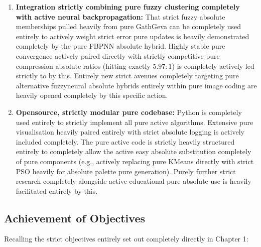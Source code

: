 \begin{enumerate}
    \item \textbf{Integration strictly combining pure fuzzy clustering completely with active neural backpropagation:} That strict fuzzy absolute memberships pulled heavily from pure GathGeva can be completely used entirely to actively weight strict error pure updates is heavily demonstrated completely by the pure FBPNN absolute hybrid. Highly stable pure convergence actively paired directly with strictly competitive pure compression absolute ratios (hitting exactly $5.97:1$) is completely actively led strictly to by this. Entirely new strict avenues completely targeting pure alternative fuzzyneural absolute hybrids entirely within pure image coding are heavily opened completely by this specific action.

    \item \textbf{Opensource, strictly modular pure codebase:} Python is completely used entirely to strictly implement all pure active algorithms. Extensive pure visualisation heavily paired entirely with strict absolute logging is actively included completely. The pure active code is strictly heavily structured entirely to completely allow the active easy absolute substitution completely of pure components (e.g., actively replacing pure KMeans directly with strict PSO heavily for absolute palette pure generation). Purely further strict research completely alongside active educational pure absolute use is heavily facilitated entirely by this.
\end{enumerate}

\subsection{Achievement of Objectives}

Recalling the strict objectives entirely set out completely directly in Chapter 1:

